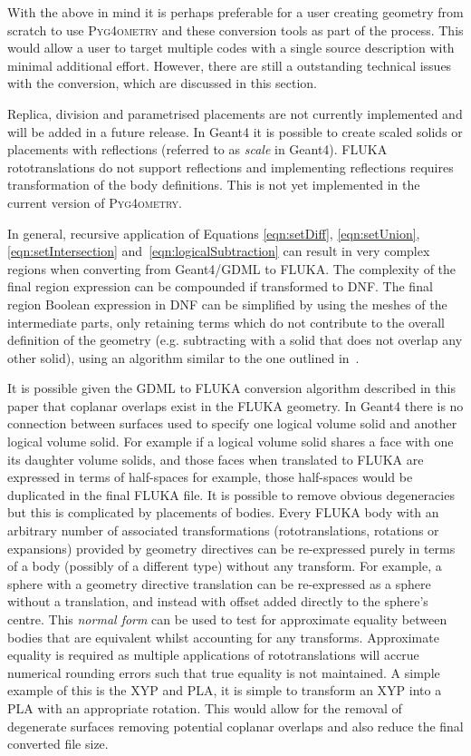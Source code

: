 \documentclass[final,5p,times,twocolumn]{elsarticle}
\newcommand{\PYGEOMETRY}{\textsc{Pyg4ometry}}
\begin{document}
With the above in mind it is perhaps preferable for a user creating
geometry from scratch to use \PYGEOMETRY{} and these conversion tools
as part of the process.  This would allow a user to target multiple codes with
a single source description with minimal additional effort.  However, there
are still a  outstanding technical issues with the conversion, which are discussed in
this section.

Replica, division and parametrised placements are not currently implemented
and will be added in a future release. In Geant4 it is possible to create scaled
solids or placements with reflections (referred to as \emph{scale} in Geant4). FLUKA
rototranslations do not support reflections and implementing reflections
requires transformation of the body definitions. This is not yet implemented
in the current version of \PYGEOMETRY{}.

In general, recursive application of Equations \ref{eqn:setDiff},
\ref{eqn:setUnion}, \ref{eqn:setIntersection}
and~\ref{eqn:logicalSubtraction} can result in very complex regions when
converting from Geant4/GDML to FLUKA. The complexity of the final region
expression can be compounded if transformed to DNF. The final region
Boolean expression in DNF can be simplified by using the meshes of the
intermediate parts, only retaining terms which do not contribute to the
overall definition of the geometry (e.g. subtracting with a solid that
does not overlap any other solid), using an algorithm similar to the one
outlined in~\cite{pruning}.

It is possible given the GDML to FLUKA conversion algorithm described in
this paper that coplanar overlaps exist in the FLUKA geometry.  In Geant4
there is no connection between surfaces used to specify one logical volume
solid and another logical volume solid. For example if a logical volume
solid shares a face with one its daughter volume solids, and those faces
when translated to FLUKA are expressed in terms of half-spaces for example,
those half-spaces would be duplicated in the final FLUKA file.  It is
possible to remove obvious degeneracies but this is complicated by
placements of bodies. Every FLUKA body with an arbitrary number of
associated transformations (rototranslations, rotations or expansions)
provided by geometry directives can be re-expressed purely in terms of a
body (possibly of a different type) without any transform.  For example, a
sphere with a geometry directive translation can be re-expressed as a
sphere without a translation, and instead with offset added directly to the
sphere's centre.  This {\em normal form} can be used to test for
approximate equality between bodies that are equivalent whilst accounting
for any transforms.  Approximate equality is required as multiple
applications of rototranslations will accrue numerical rounding errors such
that true equality is not maintained.  A simple example of this is the XYP
and PLA, it is simple to transform an XYP into a PLA with an appropriate
rotation. This would allow for the removal of degenerate surfaces removing
potential coplanar overlaps and also reduce the final converted file size.
\end{document}
